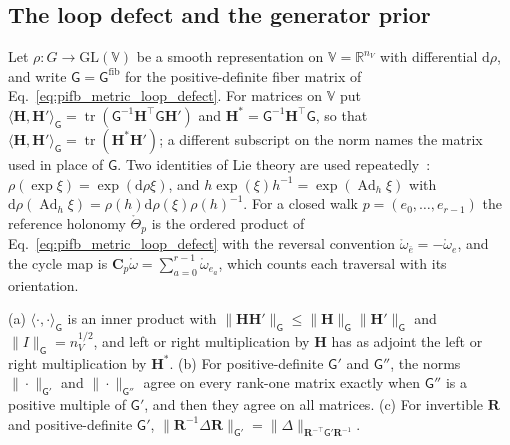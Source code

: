 \subsection{The loop defect and the generator prior}\label{app:llp_prior}

Let $\rho:G\to\mathrm{GL}(\mathbb V)$ be a smooth representation on $\mathbb V=\mathbb R^{n_V}$ with differential $\mathrm d\rho$, and write $\mathsf G=\mathsf G^{\mathrm{fib}}$ for the positive-definite fiber matrix of Eq.~\eqref{eq:pifb_metric_loop_defect}. For matrices on $\mathbb V$ put $\langle\mathbf H,\mathbf H'\rangle_{\mathsf G}=\operatorname{tr}(\mathsf G^{-1}\mathbf H^\top\mathsf G\mathbf H')$ and $\mathbf H^*=\mathsf G^{-1}\mathbf H^\top\mathsf G$, so that $\langle\mathbf H,\mathbf H'\rangle_{\mathsf G}=\operatorname{tr}(\mathbf H^*\mathbf H')$; a different subscript on the norm names the matrix used in place of $\mathsf G$. Two identities of Lie theory are used repeatedly~\cite{Hall2015}: $\rho(\exp\xi)=\exp(\mathrm d\rho\xi)$, and $h\exp(\xi)h^{-1}=\exp(\operatorname{Ad}_h\xi)$ with $\mathrm d\rho(\operatorname{Ad}_h\xi)=\rho(h)\mathrm d\rho(\xi)\rho(h)^{-1}$. For a closed walk $p=(e_0,\ldots,e_{r-1})$ the reference holonomy $\mathring\Theta_p$ is the ordered product of Eq.~\eqref{eq:pifb_metric_loop_defect} with the reversal convention $\mathring\omega_{\bar e}=-\mathring\omega_e$, and the cycle map is $\mathbf C_p\mathring\omega=\sum_{a=0}^{r-1}\mathring\omega_{e_a}$, which counts each traversal with its orientation.

\begin{lemma}\label{lem:llp_trace_form}
(a) $\langle\cdot,\cdot\rangle_{\mathsf G}$ is an inner product with $\|\mathbf H\mathbf H'\|_{\mathsf G}\leq\|\mathbf H\|_{\mathsf G}\|\mathbf H'\|_{\mathsf G}$ and $\|I\|_{\mathsf G}=n_V^{1/2}$, and left or right multiplication by $\mathbf H$ has as adjoint the left or right multiplication by $\mathbf H^*$.
(b) For positive-definite $\mathsf G'$ and $\mathsf G''$, the norms $\|\cdot\|_{\mathsf G'}$ and $\|\cdot\|_{\mathsf G''}$ agree on every rank-one matrix exactly when $\mathsf G''$ is a positive multiple of $\mathsf G'$, and then they agree on all matrices.
(c) For invertible $\mathbf R$ and positive-definite $\mathsf G'$, $\|\mathbf R^{-1}\Delta\mathbf R\|_{\mathsf G'}=\|\Delta\|_{\mathbf R^{-\top}\mathsf G'\mathbf R^{-1}}$.
\end{lemma}

